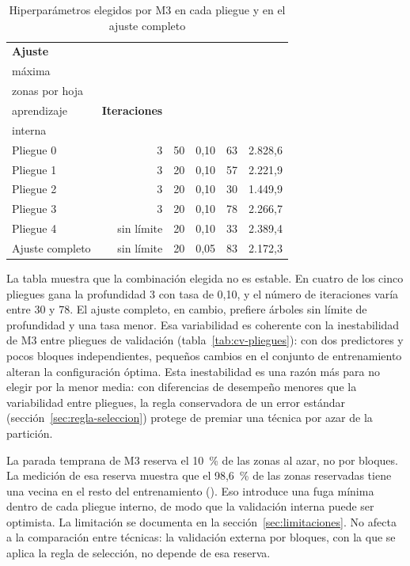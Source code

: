 \begin{table}[H]
  \centering
  \caption{Hiperparámetros elegidos por M3 en cada pliegue y en el ajuste completo}
  \label{tab:hiperparametros-m3}
  \interlineadoSimple
  \small
  \begin{tabular}{@{}lrrrrr@{}}
    \toprule
    \textbf{Ajuste} & \textbf{\celda{Profundidad\\máxima}} & \textbf{\celda{Mínimo de\\zonas por hoja}} & \textbf{\celda{Tasa de\\aprendizaje}} & \textbf{Iteraciones} & \textbf{\celda{Devianza\\interna}} \\
    \midrule
    Pliegue 0 & 3 & 50 & 0,10 & 63 & 2.828,6 \\
    Pliegue 1 & 3 & 20 & 0,10 & 57 & 2.221,9 \\
    Pliegue 2 & 3 & 20 & 0,10 & 30 & 1.449,9 \\
    Pliegue 3 & 3 & 20 & 0,10 & 78 & 2.266,7 \\
    Pliegue 4 & sin límite & 20 & 0,10 & 33 & 2.389,4 \\
    \midrule
    Ajuste completo & sin límite & 20 & 0,05 & 83 & 2.172,3 \\
    \bottomrule
  \end{tabular}
\end{table}

La tabla muestra que la combinación elegida no es estable. En cuatro de los cinco pliegues
gana la profundidad 3 con tasa de 0,10, y el número de iteraciones varía entre 30 y 78. El
ajuste completo, en cambio, prefiere árboles sin límite de profundidad y una tasa menor.
Esa variabilidad es coherente con la inestabilidad de M3 entre pliegues de validación
(tabla~\ref{tab:cv-pliegues}): con dos predictores y pocos bloques independientes, pequeños
cambios en el conjunto de entrenamiento alteran la configuración óptima. Esta inestabilidad
es una razón más para no elegir por la menor media: con diferencias de desempeño menores que
la variabilidad entre pliegues, la regla conservadora de un error estándar
(sección~\ref{sec:regla-seleccion}) protege de premiar una técnica por azar de la partición.

La parada temprana de M3 reserva el 10~\% de las zonas al azar, no por bloques. La medición
de esa reserva muestra que el 98,6~\% de las zonas reservadas tiene una vecina en el resto
del entrenamiento (). Eso introduce una fuga mínima
dentro de cada pliegue interno, de modo que la validación interna puede ser optimista. La
limitación se documenta en la sección~\ref{sec:limitaciones}. No afecta a la comparación
entre técnicas: la validación externa por bloques, con la que se aplica la regla de
selección, no depende de esa reserva.

